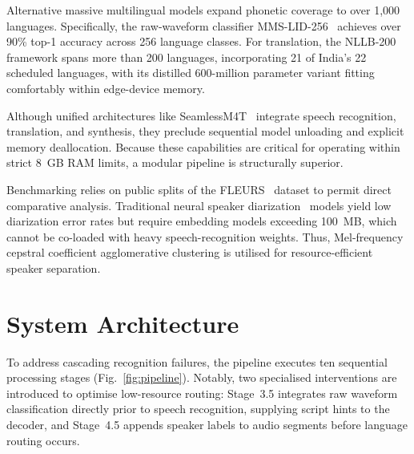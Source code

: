 \documentclass[conference]{IEEEtran}
\begin{document}
Alternative massive multilingual models expand phonetic coverage to over 1,000 languages. Specifically, the raw-waveform classifier MMS-LID-256~\cite{pratap2023scaling} achieves over 90\% top-1 accuracy across 256 language classes. For translation, the NLLB-200~\cite{costajussa2024nllb} framework spans more than 200 languages, incorporating 21 of India's 22 scheduled languages, with its distilled 600-million parameter variant fitting comfortably within edge-device memory.

Although unified architectures like SeamlessM4T~\cite{barrault2023seamless} integrate speech recognition, translation, and synthesis, they preclude sequential model unloading and explicit memory deallocation. Because these capabilities are critical for operating within strict 8~GB RAM limits, a modular pipeline is structurally superior.

Benchmarking relies on public splits of the FLEURS~\cite{conneau2023fleurs} dataset to permit direct comparative analysis. Traditional neural speaker diarization~\cite{plaquet2023powerset} models yield low diarization error rates but require embedding models exceeding 100~MB, which cannot be co-loaded with heavy speech-recognition weights. Thus, Mel-frequency cepstral coefficient agglomerative clustering is utilised for resource-efficient speaker separation.

\section{System Architecture}
\label{sec:system}

To address cascading recognition failures, the pipeline executes ten sequential processing stages (Fig.~\ref{fig:pipeline}). Notably, two specialised interventions are introduced to optimise low-resource routing: Stage~3.5 integrates raw waveform classification directly prior to speech recognition, supplying script hints to the decoder, and Stage~4.5 appends speaker labels to audio segments before language routing occurs.
\end{document}
